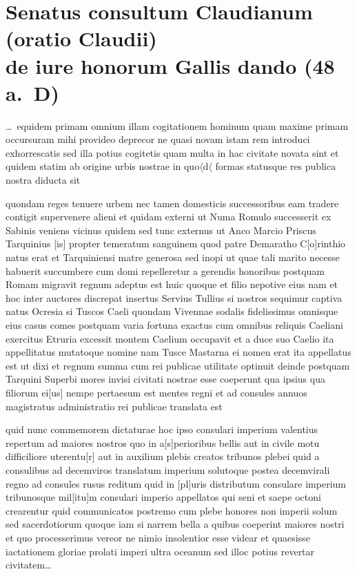 

\section*{Senatus consultum Claudianum (oratio Claudii) \\de iure honorum Gallis dando (48 a.~D)}
\label{sec:claudius}


\dots\ equidem primam omnium illam cogitationem hominum quam maxime primam occursuram mihi provideo deprecor ne quasi novam istam rem introduci exhorrescatis sed illa potius cogitetis quam multa in hac civitate novata sint et quidem statim ab origine urbis nostrae in quo$\langle$d$\langle$ formas statusque res publica nostra diducta sit 

quondam reges tenuere urbem nec tamen domesticis successoribus eam tradere contigit supervenere alieni et quidam externi ut Numa Romulo successerit ex Sabinis veniens vicinus quidem sed tunc externus ut Anco Marcio Priscus Tarquinius [is] propter temeratum sanguinem quod patre Demaratho C[o]rinthio natus erat et Tarquiniensi matre generosa sed inopi ut quae tali marito necesse habuerit succumbere cum domi repelleretur a gerendis honoribus postquam Romam migravit regnum adeptus est huic quoque et filio nepotive eius nam et hoc inter auctores discrepat insertus Servius Tullius si nostros sequimur captiva natus Ocresia si Tuscos Caeli quondam Vivennae sodalis fidelissimus omnisque eius casus comes postquam varia fortuna exactus cum omnibus reliquis Caeliani exercitus Etruria excessit montem Caelium occupavit et a duce suo Caelio ita appellitatus mutatoque nomine nam Tusce Mastarna ei nomen erat ita appellatus est ut dixi et regnum summa cum rei publicae utilitate optinuit deinde postquam Tarquini Superbi mores invisi civitati nostrae esse coeperunt qua ipsius qua filiorum ei[us] nempe pertaesum est mentes regni et ad consules annuos magistratus administratio rei publicae translata est 

quid nunc commemorem dictaturae hoc ipso consulari imperium valentius repertum ad maiores nostros quo in a[s]perioribus bellis aut in civile motu difficiliore uterentu[r] aut in auxilium plebis creatos tribunos plebei quid a consulibus ad decemviros translatum imperium solutoque postea decemvirali regno ad consules rusus reditum quid in [pl]uris distributum consulare imperium tribunosque mil[itu]m consulari imperio appellatos qui seni et saepe octoni crearentur quid communicatos postremo cum plebe honores non imperii solum sed sacerdotiorum quoque iam si narrem bella a quibus coeperint maiores nostri et quo processerimus vereor ne nimio insolentior esse videar et quaesisse iactationem gloriae prolati imperi ultra oceanum sed illoc potius revertar civitatem\dots

